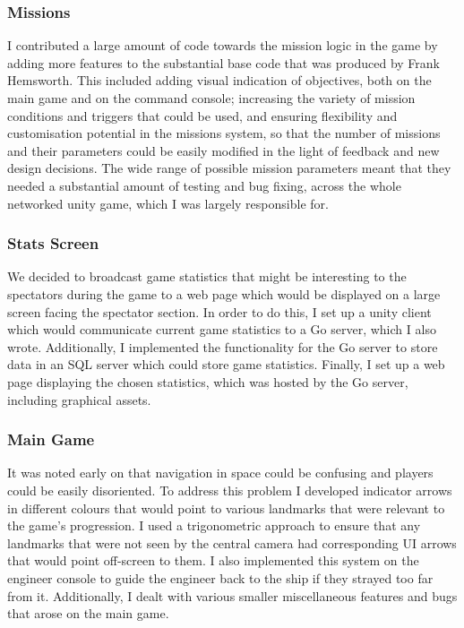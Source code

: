 \documentclass[a4paper,11pt]{article}
\begin{document}
\subsubsection{Missions}

I contributed a large amount of code towards the mission logic in the game by adding more features to the substantial base code that was produced by Frank Hemsworth. This included adding visual indication of objectives, both on the main game and on the command console; increasing the variety of mission conditions and triggers that could be used, and ensuring flexibility and customisation potential in the missions system, so that the number of missions and their parameters could be easily modified in the light of feedback and new design decisions. The wide range of possible mission parameters meant that they needed a substantial amount of testing and bug fixing, across the whole networked unity game, which I was largely responsible for.

\subsubsection{Stats Screen}

We decided to broadcast game statistics that might be interesting to the spectators during the game to a web page which would be displayed on a large screen facing the spectator section. In order to do this, I set up a unity client which would communicate current game statistics to a Go server, which I also wrote. Additionally, I implemented the functionality for the Go server to store data in an SQL server which could store game statistics. Finally, I set up a web page displaying the chosen statistics, which was hosted by the Go server, including graphical assets.

\subsubsection{Main Game}

It was noted early on that navigation in space could be confusing and players could be easily disoriented. To address this problem I developed indicator arrows in different colours that would point to various landmarks that were relevant to the game’s progression. I used a trigonometric approach to ensure that any landmarks that were not seen by the central camera had corresponding UI arrows that would point off-screen to them. I also implemented this system on the engineer console to guide the engineer back to the ship if they strayed too far from it. Additionally, I dealt with various smaller miscellaneous features and bugs that arose on the main game.
\end{document}
